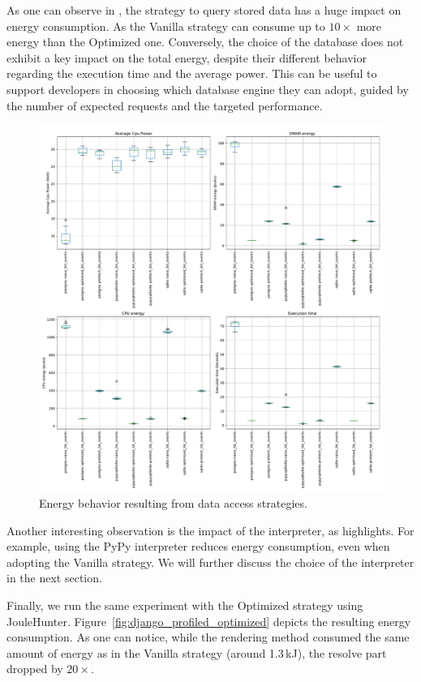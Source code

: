 As one can observe in , the strategy to query stored data has a huge impact on energy consumption.
As the \textsf{Vanilla} strategy can consume up to $10\times$ more energy than the \textsf{Optimized} one.
Conversely, the choice of the database does not exhibit a key impact on the total energy, despite their different behavior regarding the execution time and the average power.
This can be useful to support developers in choosing which database engine they can adopt, guided by the number of expected requests and the targeted performance.

\begin{figure}[!hbt]
    \centering
    \includegraphics[width=\linewidth]{imgs/django}
    \caption{Energy behavior resulting from data access strategies.}
    \label{fig:django}
\end{figure}

Another interesting observation is the impact of the interpreter, as  highlights.
For example, using the \textsf{PyPy} interpreter reduces energy consumption, even when adopting the \textsf{Vanilla} strategy. We will further discuss the choice of the interpreter in the next section.

Finally, we run the same experiment with the \textsf{Optimized} strategy using JouleHunter.
Figure~\ref{fig:django_profiled_optimized} depicts the resulting energy consumption.
As one can notice, while the rendering method consumed the same amount of energy as in the \textsf{Vanilla} strategy (around 1.3\,kJ), the resolve part dropped by $20\times$.

